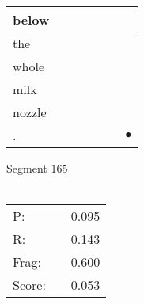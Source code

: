 \documentclass[landscape]{article}
\newcommand{\ssp}{\hspace{2pt}}
\newcommand{\mex}{\cellcolor{g}$\bullet$}
\begin{document}
\begin{tabular}{|l|p{10pt}|p{10pt}|p{10pt}|p{10pt}|p{10pt}|p{10pt}|}
\hline
\ssp below \ssp&\hspace{2pt}&\hspace{2pt}&\hspace{2pt}&\hspace{2pt}&\hspace{2pt}&\hspace{2pt}\\
\hline
\ssp the \ssp&\hspace{2pt}&\hspace{2pt}&\hspace{2pt}&\hspace{2pt}&\hspace{2pt}&\hspace{2pt}\\
\hline
\ssp whole \ssp&\hspace{2pt}&\hspace{2pt}&\hspace{2pt}&\hspace{2pt}&\hspace{2pt}&\hspace{2pt}\\
\hline
\ssp milk \ssp&\hspace{2pt}&\hspace{2pt}&\hspace{2pt}&\hspace{2pt}&\hspace{2pt}&\hspace{2pt}\\
\hline
\ssp nozzle \ssp&\hspace{2pt}&\hspace{2pt}&\hspace{2pt}&\hspace{2pt}&\hspace{2pt}&\hspace{2pt}\\
\hline
\ssp \cellcolor{ref5}. \ssp&\hspace{2pt}&\hspace{2pt}&\hspace{2pt}&\hspace{2pt}&\hspace{2pt}&\hspace{2pt}\mex\\
\hline
\end{tabular}

\vspace{6pt}
\noindent Segment 165\\\\
\noindent\begin{tabular}{lm{12pt}r}
\hline
P:&&0.095\\
R:&&0.143\\
Frag:&&0.600\\
Score:&&0.053\\
\end{tabular}
\end{document}
